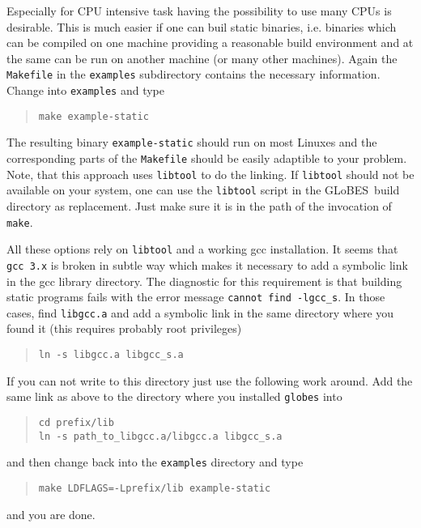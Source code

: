 \documentclass{article}
\newcommand{\glb}{{\sf GLoBES}}
\begin{document}
Especially for CPU intensive task having the possibility to use many CPUs is desirable. This is much easier if one can buil static binaries, i.e. binaries which can be compiled on
one machine providing a reasonable build environment and at
the same can be run on another machine 
(or many other machines). Again the \verb^Makefile^ in the
\verb^examples^ subdirectory contains the necessary information. Change into \verb^examples^ and type
\begin{quote}
\begin{verbatim}
make example-static
\end{verbatim}
\end{quote}
The resulting binary \verb^example-static^ should run on most Linuxes and the corresponding parts of the \verb^Makefile^ should be easily adaptible to your problem. Note, that this approach uses \verb^libtool^ to do the linking. If \verb^libtool^ should not be available on your system, one can use the
\verb^libtool^ script in the \glb\ build directory as replacement. Just make sure it is in the path of the invocation of
\verb^make^.

All these options rely on \verb^libtool^ and a working gcc installation. It seems that \verb^gcc 3.x^
is broken in subtle way which makes it necessary to add a symbolic link in the gcc library
directory. The diagnostic for this requirement is that building static programs fails with
the error message \verb^cannot find -lgcc_s^. In those cases, find \verb^libgcc.a^ and add a symbolic 
link in the same directory where you found it (this requires probably root privileges)
\begin{quote}
\begin{verbatim}
ln -s libgcc.a libgcc_s.a
\end{verbatim}
\end{quote}

If you can not write to this directory just use the following work around. Add the same link  as above to 
the directory where you installed \verb^globes^ into
\begin{quote}
\begin{verbatim}
cd prefix/lib       
ln -s path_to_libgcc.a/libgcc.a libgcc_s.a
\end{verbatim}
\end{quote}
and then change back into the \verb^examples^ directory and type
 \begin{quote}
\begin{verbatim}
make LDFLAGS=-Lprefix/lib example-static
\end{verbatim}
\end{quote}
and you are done.

 
\end{document}
